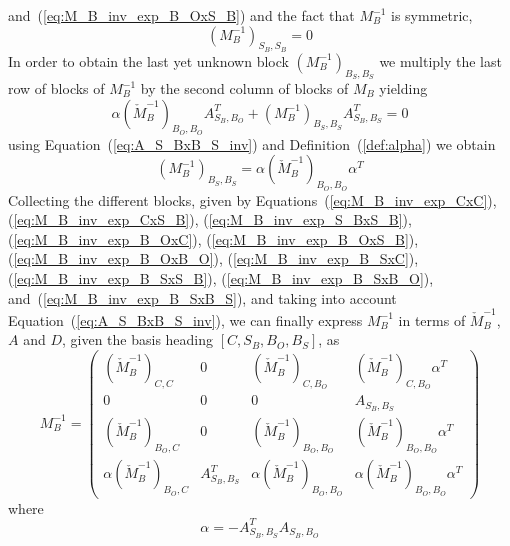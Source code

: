 \documentclass[a4paper]{article}
\begin{document}
and~(\ref{eq:M_B_inv_exp_B_OxS_B}) and the fact that $M_{B}^{-1}$ is symmetric, 
\begin{equation}
\label{eq:M_B_inv_exp_S_BxS_B}
\left(M_{B}^{-1}\right)_{S_{B}, S_{B}} = 0
\end{equation}
In order to obtain the last yet unknown block
$\left(M_{B}^{-1}\right)_{B_{S}, B_{S}}$
we multiply the last row of blocks of $M_{B}^{-1}$ by
the second column of blocks of $M_{B}$ yielding
\begin{equation*}
\alpha\left(\check{M}_{B}^{-1}\right)_{B_{O}, B_{O}} A_{S_{B}, B_{O}}^{T}
  + \left(M_{B}^{-1}\right)_{B_{S}, B_{S}} A_{S_{B}, B_{S}}^{T}
= 0
\end{equation*}
using Equation~(\ref{eq:A_S_BxB_S_inv}) and
Definition~(\ref{def:alpha}) we obtain
\begin{equation}
\label{eq:M_B_inv_exp_B_SxB_S}
\left(M_{B}^{-1}\right)_{B_{S}, B_{S}} =
  \alpha\left(\check{M}_{B}^{-1}\right)_{B_{O}, B_{O}}\alpha^{T}
\end{equation}
Collecting the different blocks, given by 
Equations~(\ref{eq:M_B_inv_exp_CxC}), (\ref{eq:M_B_inv_exp_CxS_B}),
(\ref{eq:M_B_inv_exp_S_BxS_B}), (\ref{eq:M_B_inv_exp_B_OxC}),
(\ref{eq:M_B_inv_exp_B_OxS_B}), (\ref{eq:M_B_inv_exp_B_OxB_O}),
(\ref{eq:M_B_inv_exp_B_SxC}), (\ref{eq:M_B_inv_exp_B_SxS_B}),
(\ref{eq:M_B_inv_exp_B_SxB_O}), and~(\ref{eq:M_B_inv_exp_B_SxB_S}),
and taking into account Equation~(\ref{eq:A_S_BxB_S_inv}),
we can finally express $M_{B}^{-1}$ in terms
of $\check{M}_{B}^{-1}$, $A$ and $D$, given the basis heading
$\left[C, S_{B}, B_{O}, B_{S}\right]$, as
\begin{equation}
\label{eq:M_B_inv_exp}
M_{B}^{-1}=
\left(\begin{array}{c|c|c|c}
        \left(\check{M}_{B}^{-1}\right)_{C,C} &
	0 &
	\left(\check{M}_{B}^{-1}\right)_{C,B_{O}} &
	 \left(\check{M}_{B}^{-1}\right)_{C, B_{O}}\alpha^{T} \\
	\hline
	0 &
	0 &
	0 &
	A_{S_{B},B_{S}} \\
	\hline
	\left(\check{M}_{B}^{-1}\right)_{B_{O}, C} &
	0 &
	\left(\check{M}_{B}^{-1}\right)_{B_{O}, B_{O}} &
          \left(\check{M}_{B}^{-1}\right)_{B_{O},B_{O}}\alpha^{T} \\
	\hline
	\alpha\left(\check{M}_{B}^{-1}\right)_{B_{O},
	C} &
	A_{S_{B}, B_{S}}^{T} &
	\alpha\left(\check{M}_{B}^{-1}\right)_{B_{O},
	B_{O}} &
	\alpha\left(\check{M}_{B}^{-1}\right)_{B_{O}, B_{O}}\alpha^{T}
      \end{array}
\right)
\end{equation}
where
\begin{equation*}
\alpha=-A_{S_{B}, B_{S}}^{T}A_{S_{B}, B_{O}}
\end{equation*}
\end{document}
